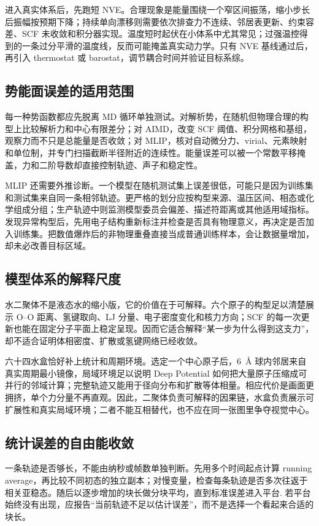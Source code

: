 \documentclass[UTF8,10pt,a4paper,fontset=none]{ctexart}
\begin{document}
进入真实体系后，先跑短 NVE。合理现象是能量围绕一个窄区间振荡，缩小步长后振幅按预期下降；持续单向漂移则需要依次排查力不连续、邻居表更新、约束容差、SCF 未收敛和积分器实现。温度短时起伏在小体系中尤其常见；过强温控得到的一条过分平滑的温度线，反而可能掩盖真实动力学。只有 NVE 基线通过后，再引入 thermostat 或 barostat，调节耦合时间并验证目标系综。

\subsection{势能面误差的适用范围}

每一种势函数都应先脱离 MD 循环单独测试。对解析势，在随机但物理合理的构型上比较解析力和中心有限差分；对 AIMD，改变 SCF 阈值、积分网格和基组，观察力而不只是总能量是否收敛；对 MLIP，核对自动微分力、virial、元素映射和单位制，并专门扫描截断半径附近的连续性。能量误差可以被一个常数平移掩盖，力和二阶导数却直接控制轨迹、声子和稳定性。

MLIP 还需要外推诊断。一个模型在随机测试集上误差很低，可能只是因为训练集和测试集来自同一条相邻轨迹。更严格的划分应按构型来源、温压区间、相态或化学组成分组；生产轨迹中则监测模型委员会偏差、描述符距离或其他适用域指标。发现异常构型后，先用电子结构重新标注并检查是否具有物理意义，再决定是否加入训练集。把数值爆炸后的非物理重叠直接当成普通训练样本，会让数据量增加，却未必改善目标区域。

\subsection{模型体系的解释尺度}

水二聚体不是液态水的缩小版，它的价值在于可解释。六个原子的构型足以清楚展示 O--O 距离、氢键取向、LJ 分量、电子密度变化和核力方向；SCF 的每一次更新也能在固定分子平面上稳定呈现。因而它适合解释“某一步为什么得到这支力”，却不适合证明体相密度、扩散或氢键网络已经收敛。

六十四水盒恰好补上统计和周期环境。选定一个中心原子后，$6$~\AA{} 球内邻居来自真实周期最小镜像，局域环境足以说明 Deep Potential 如何把大量原子压缩成可并行的邻域计算；完整轨迹又能用于径向分布和扩散等体相量。相应代价是画面更拥挤，单个力分量不再直观。因此，二聚体负责可解释的因果链，水盒负责展示可扩展性和真实局域环境；二者不能互相替代，也不应在同一张图里争夺视觉中心。

\subsection{统计误差的自由能收敛}

一条轨迹是否够长，不能由纳秒或帧数单独判断。先用多个时间起点计算 running average，再比较不同初态的独立副本；对慢变量，检查每条轨迹是否多次往返于相关亚稳态。随后以逐步增加的块长做分块平均，直到标准误差进入平台\cite{flyvbjerg1989}. 若平台始终没有出现，应报告“当前轨迹不足以估计误差”，而不是选择一个看起来合适的块长。
\end{document}
